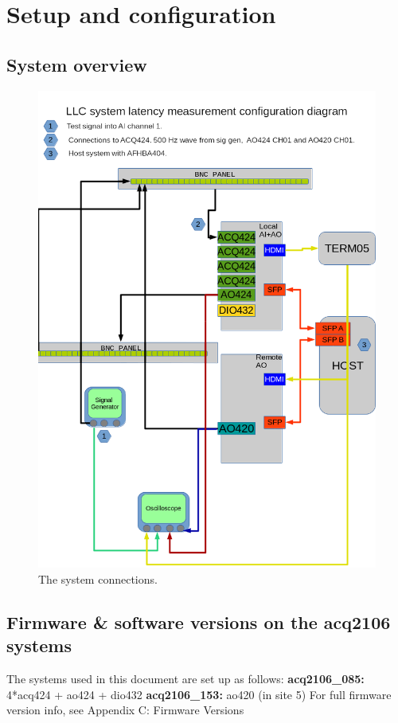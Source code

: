 \documentclass{article}
\begin{document}
\section{Setup and configuration} \label{setup}

\subsection{System overview}
\begin{figure}
	\centering
	\includegraphics[width=5.0in]{images/remote_ao_diagram_p.png}
	\caption{The system connections.}
	\label{systemconnections}
\end{figure}

\subsection{Firmware \& software versions on the acq2106 systems}
The systems used in this document are set up as follows: 
\newline
\textbf{acq2106\_085:} 4*acq424 + ao424 + dio432
\newline
\textbf{acq2106\_153:} ao420 (in site 5)
\newline
For full firmware version info, see Appendix C: Firmware Versions
\end{document}
